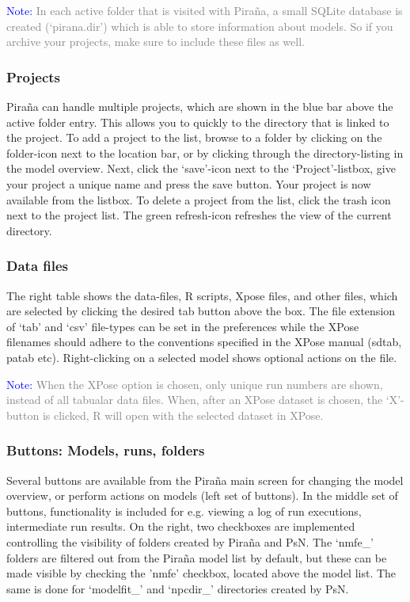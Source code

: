 \documentclass[a4,11pt]{report} \usepackage[pdftex]{graphicx}
\begin{document}
\vspace{8pt}
\noindent\scriptsize{\textcolor{Blue}{Note:} \textcolor{Grey}{In each active folder that
    is visited with Pira\~na, a small SQLite database is created
    (`pirana.dir') which is able to store information about models. So
    if you archive your projects, make sure to include these files as
    well.  }

  \subsubsection*{Projects} Pira\~na can handle multiple projects,
  which are shown in the blue bar above the active folder entry. This
  allows you to quickly to the directory that is linked to the project. To add a project to the
  list, browse to a folder by clicking on the folder-icon next to the
  location bar, or by clicking through the directory-listing in the
  model overview. Next, click the `save'-icon next to the
  `Project'-listbox, give your project a unique name and press the
  save button. Your project is now available from the listbox. To
  delete a project from the list, click the trash icon next to the
  project list. The green refresh-icon refreshes the view of the
  current directory.

\subsubsection*{Data files} The right table shows the data-files, R
scripts, Xpose files, and other files, which are selected by clicking
the desired tab button above the box. The file extension of `tab' and
`csv' file-types can be set in the preferences while the XPose
filenames should adhere to the conventions specified in the XPose
manual (sdtab, patab etc). Right-clicking on a selected model shows
optional actions on the file.

\vspace{8pt}
\noindent\scriptsize{\textcolor{Blue}{Note:} \textcolor{Grey}{When the
XPose option is chosen, only unique run numbers are shown, instead of
all tabualar data files. When, after an XPose dataset is chosen, the
`X'-button is clicked, R will open with the selected dataset in XPose.
} \normalsize

\subsubsection*{Buttons: Models, runs, folders} Several buttons are
available from the Pira\~na main screen for changing the model
overview, or perform actions on models (left set of buttons). In the
middle set of buttons, functionality is included for e.g. viewing a
log of run executions, intermediate run results. On the right, two
checkboxes are implemented controlling the visibility of folders
created by Pira\~na and PsN. The `nmfe\_' folders are filtered out
from the Pira\~na model list by default, but these can be made visible
by checking the 'nmfe' checkbox, located above the model list. The
same is done for `modelfit\_' and `npcdir\_' directories created by PsN.}
\normalsize


}
\end{document}
